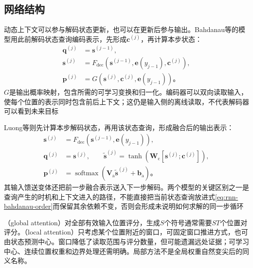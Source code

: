 \subsection{网络结构}
\label{sec:rnn-attentive-architecture}

动态上下文可以参与解码状态更新，也可以在更新后参与输出。Bahdanau等的模型用此前解码状态查询编码表示，先形成$\bm{c}^{(j)}$，再计算本步状态：
\begin{equation}
  \begin{aligned}
    \bm{q}^{(j)}&=\bm{s}^{(j-1)},\\
    \bm{s}^{(j)}&=F_{\mathrm{dec}}\!\left(
      \bm{s}^{(j-1)},\bm{e}(y_{j-1}),\bm{c}^{(j)}\right),\\
    \bm{p}^{(j)}&=G\!\left(\bm{s}^{(j)},\bm{c}^{(j)},\bm{e}(y_{j-1})\right)\text{。}
  \end{aligned}
  \label{eq:rnn-bahdanau-order}
\end{equation}
$G$是输出概率映射，包含所需的可学习变换和归一化。编码器可以双向读取输入，使每个位置的表示同时包含前后上下文；这仍是输入侧的离线读取，不代表解码器可以看到未来目标

Luong等则先计算本步解码状态，再用该状态查询，形成融合后的输出表示：
\begin{equation}
  \begin{aligned}
    \bm{s}^{(j)}&=F_{\mathrm{dec}}\!\left(
      \bm{s}^{(j-1)},\bm{e}(y_{j-1})\right),\\
    \bm{q}^{(j)}&=\bm{s}^{(j)},\qquad
    \widetilde{\bm{s}}^{(j)}=
       \tanh\!\left(\bm{W}_{\mathrm{c}}[\bm{s}^{(j)};\bm{c}^{(j)}]\right),\\
    \bm{p}^{(j)}&=\operatorname{softmax}\!\left(
      \bm{V}_{\mathrm{a}}\widetilde{\bm{s}}^{(j)}+\bm{b}_{\mathrm{a}}\right)\text{。}
  \end{aligned}
  \label{eq:rnn-luong-order}
\end{equation}
其输入馈送变体还把前一步融合表示送入下一步解码。两个模型的关键区别之一是查询产生的时机和上下文进入的路径，不能直接把当前状态查询放进式\eqref{eq:rnn-bahdanau-order}而保留其余依赖不变，否则会形成未说明如何求解的同一步循环

（global attention）对全部有效输入位置评分，生成$S$个符号通常需要$ST$个位置对评分。（local attention）只考虑某个位置附近的窗口，可固定窗口推进方式，也可由状态预测中心。窗口降低了读取范围与评分数量，但可能遗漏远处证据；可学习中心、连续位置权重和边界处理还需明确。局部方法不是全局权重自然变尖后的同义名称。


